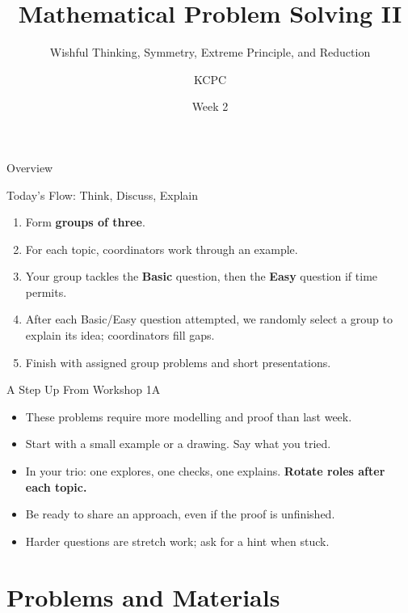 \documentclass{beamer}
\title{Mathematical Problem Solving II}
\subtitle{Wishful Thinking, Symmetry, Extreme Principle, and Reduction}
\author{KCPC}
\date{Week 2}
\begin{document}
\begin{frame}
    \titlepage
\end{frame}

\begin{frame}{Overview}
    \tableofcontents
\end{frame}

\begin{frame}{Today's Flow: Think, Discuss, Explain}
    \begin{enumerate}[<1->]
        \item Form \textbf{groups of three}.
        \item For each topic, coordinators work through an example.
        \item Your group tackles the \textbf{Basic} question, then the
            \textbf{Easy} question if time permits.
        \item After each Basic/Easy question attempted, we randomly
            select a group to explain its idea; coordinators fill gaps.
        \item Finish with assigned group problems and short presentations.
    \end{enumerate}
\end{frame}

\begin{frame}{A Step Up From Workshop 1A}
    \begin{itemize}[<1->]
        \item These problems require more modelling and proof than last week.
        \item Start with a small example or a drawing. Say what you tried.
        \item In your trio: one explores, one checks, one explains.
            \textbf{Rotate roles after each topic.}
        \item Be ready to share an approach, even if the proof is unfinished.
        \item Harder questions are stretch work; ask for a hint when stuck.
    \end{itemize}
\end{frame}

\section{Problems and Materials}
\end{document}
